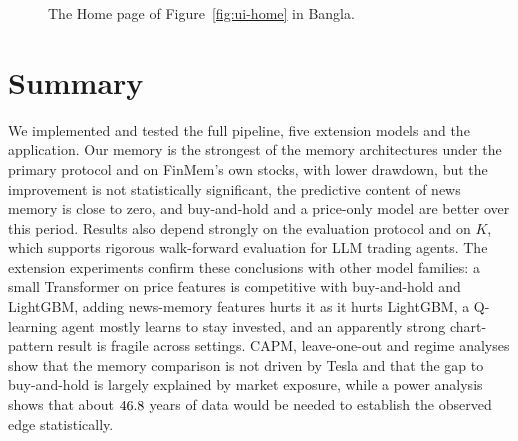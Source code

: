 \begin{figure}[!htbp]
\centering
{}
\caption{The Home page of Figure~\ref{fig:ui-home} in Bangla.}
\label{fig:ui-home-bn}
\end{figure}

\section{Summary}
We implemented and tested the full pipeline, five extension models and the application. Our memory is the strongest of the memory architectures under the primary protocol and on FinMem's own stocks, with lower drawdown, but the improvement is not statistically significant, the predictive content of news memory is close to zero, and buy-and-hold and a price-only model are better over this period. Results also depend strongly on the evaluation protocol and on $K$, which supports rigorous walk-forward evaluation for LLM trading agents. The extension experiments confirm these conclusions with other model families: a small Transformer on price features is competitive with buy-and-hold and LightGBM, adding news-memory features hurts it as it hurts LightGBM, a Q-learning agent mostly learns to stay invested, and an apparently strong chart-pattern result is fragile across settings. CAPM, leave-one-out and regime analyses show that the memory comparison is not driven by Tesla and that the gap to buy-and-hold is largely explained by market exposure, while a power analysis shows that about $46.8$ years of data would be needed to establish the observed edge statistically.
